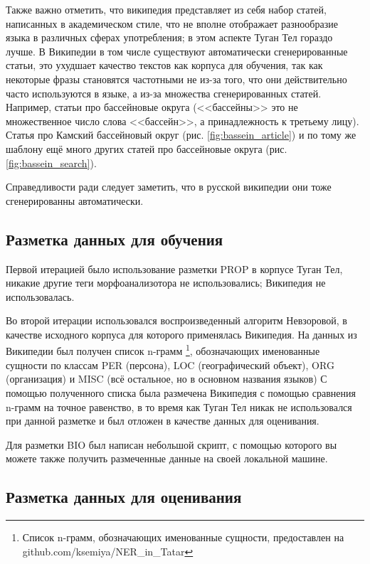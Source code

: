 Также важно отметить, что википедия представляет из себя набор статей, написанных в академическом стиле, что не вполне отображает разнообразие языка в различных сферах употребления; в этом аспекте Туган Тел гораздо лучше. В Википедии в том числе существуют автоматически сгенерированные статьи, это ухудшает качество текстов как корпуса для обучения, так как некоторые фразы становятся частотными не из-за того, что они действительно часто используются в языке, а из-за множества сгенерированных статей. Например, статьи про бассейновые округа (<<бассейны>> это не множественное число слова <<бассейн>>, а принадлежность к третьему лицу). Статья про Камский бассейновый округ (рис. \ref{fig:bassein_article}) и по тому же шаблону ещё много других статей про бассейновые округа (рис. \ref{fig:bassein_search}).

Справедливости ради следует заметить, что в русской википедии они тоже сгенерированны автоматически.

\subsection{Разметка данных для обучения}

Первой итерацией было использование разметки PROP в корпусе Туган Тел, никакие другие теги морфоанализотора не использовались; Википедия не использовалась. 

Во второй итерации использовался воспроизведенный алгоритм Невзоровой, в качестве исходного корпуса для которого применялась Википедия. На данных из Википедии был получен список n-грамм \footnote{Список n-грамм, обозначающих именованные сущности, предоставлен на github.com/ksemiya/NER\_in\_Tatar}, обозначающих именованные сущности по классам PER (персона), LOC (географический объект), ORG (организация) и MISC (всё остальное, но в основном названия языков) С помощью полученного списка была размечена Википедия с помощью сравнения n-грамм на точное равенство, в то время как Туган Тел никак не использовался при данной разметке и был отложен в качестве данных для оценивания.

Для разметки BIO был написан небольшой скрипт, с помощью которого вы можете также получить размеченные данные на своей локальной машине.


\subsection{Разметка данных для оценивания}

